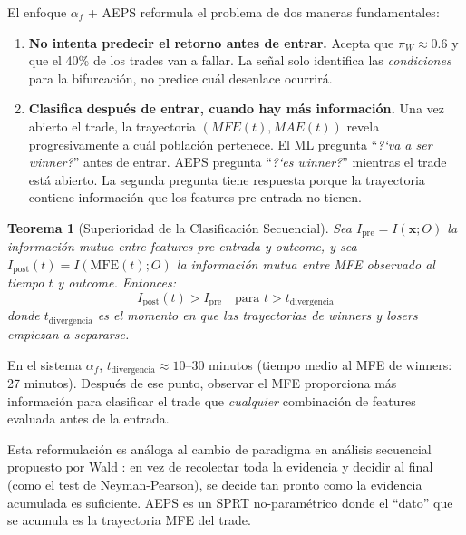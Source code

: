 \documentclass[11pt,a4paper]{article}
\newtheorem{theorem}{Teorema}[section]
\newcommand{\af}{\alpha_f}
\begin{document}
El enfoque $\af$ + AEPS reformula el problema de dos maneras
fundamentales:

\begin{enumerate}[leftmargin=1.5em]
\item \textbf{No intenta predecir el retorno antes de entrar.}
  Acepta que $\pi_W \approx 0.6$ y que el 40\% de los trades van a
  fallar. La se\~nal solo identifica las \textit{condiciones} para
  la bifurcaci\'on, no predice cu\'al desenlace ocurrir\'a.

\item \textbf{Clasifica despu\'es de entrar, cuando hay m\'as
  informaci\'on.} Una vez abierto el trade, la trayectoria
  $(MFE(t), MAE(t))$ revela progresivamente a cu\'al poblaci\'on
  pertenece. El ML pregunta ``\textit{?`va a ser winner?}'' antes de
  entrar. AEPS pregunta ``\textit{?`es winner?}'' mientras el trade
  est\'a abierto. La segunda pregunta tiene respuesta porque la
  trayectoria contiene informaci\'on que los features pre-entrada
  no tienen.
\end{enumerate}

\begin{theorem}[Superioridad de la Clasificaci\'on Secuencial]
\label{thm:seq_superior}
Sea $I_{\text{pre}} = I(\bm{x}; O)$ la informaci\'on mutua entre
features pre-entrada y outcome, y sea
$I_{\text{post}}(t) = I(\text{MFE}(t); O)$ la informaci\'on mutua
entre MFE observado al tiempo $t$ y outcome. Entonces:
\begin{equation}
I_{\text{post}}(t) > I_{\text{pre}} \quad \text{para } t > t_{\text{divergencia}}
\end{equation}
donde $t_{\text{divergencia}}$ es el momento en que las trayectorias
de winners y losers empiezan a separarse.
\end{theorem}

En el sistema $\af$, $t_{\text{divergencia}} \approx 10$--$30$
minutos (tiempo medio al MFE de winners: 27 minutos). Despu\'es de
ese punto, observar el MFE proporciona m\'as informaci\'on para
clasificar el trade que \textit{cualquier} combinaci\'on de features
evaluada antes de la entrada.

Esta reformulaci\'on es an\'aloga al cambio de paradigma en
an\'alisis secuencial propuesto por Wald \cite{wald1945sequential}:
en vez de recolectar toda la evidencia y decidir al final (como el
test de Neyman-Pearson), se decide tan pronto como la evidencia
acumulada es suficiente. AEPS es un SPRT no-param\'etrico
\cite{tartakovsky2014sequential} donde el ``dato'' que se acumula
es la trayectoria MFE del trade.
\end{document}
